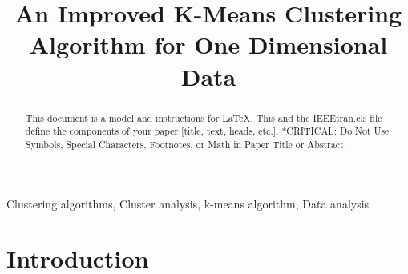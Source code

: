 \documentclass[conference,compsoc]{IEEEtran}
\begin{document}
\title{An Improved K-Means Clustering Algorithm for One Dimensional Data}

\author{
\and

\and

}

\maketitle

\begin{abstract}
This document is a model and instructions for \LaTeX.
This and the IEEEtran.cls file define the components of your paper [title, text, heads, etc.]. *CRITICAL: Do Not Use Symbols, Special Characters, Footnotes, 
or Math in Paper Title or Abstract.
\end{abstract}

\begin{IEEEkeywords}
Clustering algorithms, Cluster analysis, k-means algorithm, Data analysis
\end{IEEEkeywords}

\section{Introduction}
\end{document}
